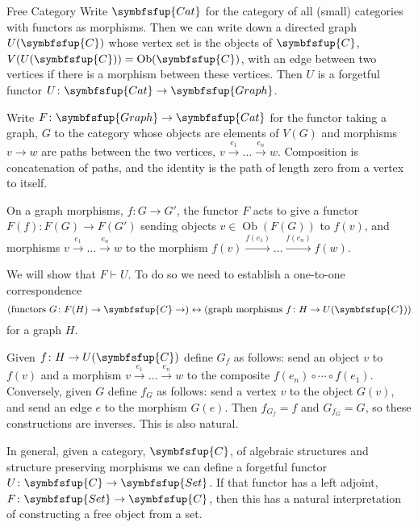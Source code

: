 \documentclass[fleqn]{NotesClass}
\makeatletter
\newcommand{\cat}[1]{\symbfsfup{#1}}
\newcommand{\c@egory}[1]{\symbfsfup{#1}}
\newcommand{\Set}{\c@egory{Set}}
\newcommand{\Cat}{\c@egory{Cat}}
\newcommand{\Graph}{\c@egory{Graph}}
\DeclareMathOperator{\Ob}{Ob}
\newcommand{\leftadjoint}{\vdash}
\makeatother
\begin{document}
\begin{appendices}
\begin{exm}{Free Category}{}
            Write \(\Cat\) for the category of all (small) categories with functors as morphisms.
            Then we can write down a directed graph \(U(\cat{C})\) whose vertex set is the objects of \(\cat{C}\), \(V(U(\cat{C})) = \Ob(\cat{C})\), with an edge between two vertices if there is a morphism between these vertices.
            Then \(U\) is a forgetful functor \(U \colon \Cat \to \Graph\).
            
            Write \(F \colon \Graph \to \Cat\) for the functor taking a graph, \(G\) to the category whose objects are elements of \(V(G)\) and morphisms \(v \to w\) are paths between the two vertices, \(v \xrightarrow{e_1} \dotso \xrightarrow{e_n} w\).
            Composition is concatenation of paths, and the identity is the path of length zero from a vertex to itself.
            
            On a graph morphisms, \(f \colon G \to G'\), the functor \(F\) acts to give a functor \(F(f) \colon F(G) \to F(G')\) sending objects \(v \in \Ob(F(G))\) to \(f(v)\), and morphisms \(v \xrightarrow{e_1} \dotso \xrightarrow{e_n} w\) to the morphism \(f(v) \xrightarrow{f(e_1)} \dotso \xrightarrow{f(e_n)} f(w)\).
            
            We will show that \(F \leftadjoint U\).
            To do so we need to establish a one-to-one correspondence
            \begin{equation}
                (\text{functors } G \colon F(H) \to \cat{C} \to) \leftrightarrow (\text{graph morphisms } f \colon H \to U(\cat{C}))
            \end{equation}
            for a graph \(H\).
            
            Given \(f \colon H \to U(\cat{C})\) define \(G_f\) as follows: send an object \(v\) to \(f(v)\) and a morphism \(v \xrightarrow{e_1} \dotso \xrightarrow{e_n} w\) to the composite \(f(e_n) \circ \dotsm \circ f(e_1)\).
            Conversely, given \(G\) define \(f_G\) as follows: send a vertex \(v\) to the object \(G(v)\), and send an edge \(e\) to the morphism \(G(e)\).
            Then \(f_{G_f} = f\) and \(G_{f_G} = G\), so these constructions are inverses.
            This is also natural.
        \end{exm}
        
        In general, given a category, \(\cat{C}\), of algebraic structures and structure preserving morphisms we can define a forgetful functor \(U \colon \cat{C} \to \Set\).
        If that functor has a left adjoint, \(F \colon \Set \to \cat{C}\), then this has a natural interpretation of constructing a free object from a set.
        

\end{appendices}
\end{document}
